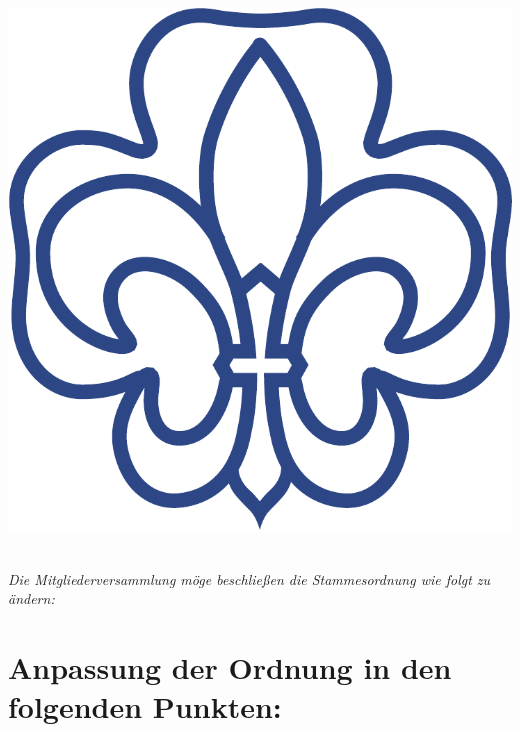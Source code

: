 \documentclass[a4paper]{article}
\begin{document}
\begin{center}
\begin{minipage}{.2\textwidth}
        \includegraphics[width=.85\linewidth]{Zeichen.pdf}
    \end{minipage}%
\end{center}
~\\[0.5cm] 

\emph{Die Mitgliederversammlung möge beschließen die Stammesordnung wie folgt zu ändern:}

\section{Anpassung der Ordnung in den folgenden Punkten:} %
\label{sec:anpassung_der_ordnung_auf_die_neue_beauftragung}
\end{document}
